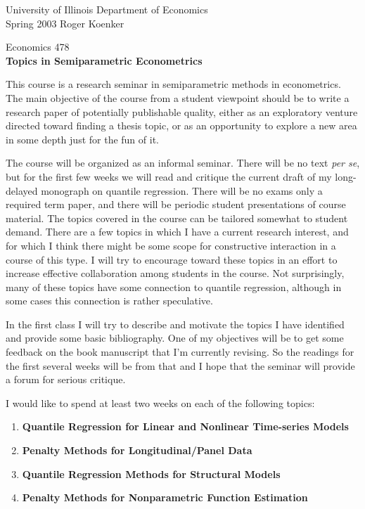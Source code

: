 




\noindent
University of Illinois \hfill Department of Economics \\
Spring 2003 \hfill Roger Koenker
\begin{center}
\large{
{ Economics 478 \\
{\bf Topics in Semiparametric Econometrics}}}
\end{center}

\vspace{3mm}
This course is a research seminar in semiparametric methods in
econometrics.  The main objective of the course from a student viewpoint
should be to write a research paper of potentially publishable quality,
either as an exploratory venture directed toward finding a thesis topic,
or as an opportunity to explore a new area in some depth just for the
fun of it.

The course will be organized as an informal seminar.  
There will be no text {\em per se}, but for the first few weeks we
will read and critique the current draft of my long-delayed monograph
on quantile regression.  There will be no exams only a required term paper,
and there will be periodic student presentations of course material.
The topics covered in the course can be tailored somewhat to student
demand.  There are a few topics in which I have a current research interest,
and for which I think there might be some scope for constructive interaction 
in a course of this type.  I will try to encourage toward these topics
in an effort to increase effective collaboration among students in the
course.  Not surprisingly, many of these topics have some connection
to quantile regression, although in some cases this connection is rather
speculative.

In the first class I will try to describe and motivate the topics I have
identified and provide some basic bibliography.  One of my objectives
will be to get some feedback on the book manuscript that I'm currently
revising.  So the readings for the first several weeks will be from
that and I hope that the seminar will provide a forum for serious critique.

I would like to spend at least two weeks on each of the following topics:

\begin{enumerate}
\item {\bf Quantile Regression for Linear and Nonlinear Time-series Models}
\item {\bf Penalty Methods for Longitudinal/Panel Data}
\item {\bf Quantile Regression Methods for Structural Models}
\item {\bf Penalty Methods for Nonparametric Function Estimation}
\end{enumerate}


